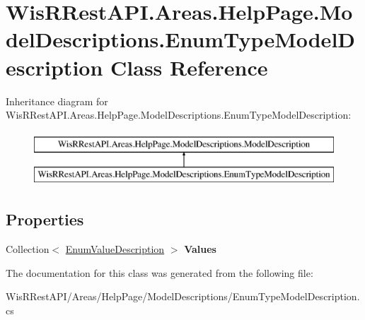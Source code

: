 \hypertarget{class_wis_r_rest_a_p_i_1_1_areas_1_1_help_page_1_1_model_descriptions_1_1_enum_type_model_description}{}\section{Wis\+R\+Rest\+A\+P\+I.\+Areas.\+Help\+Page.\+Model\+Descriptions.\+Enum\+Type\+Model\+Description Class Reference}
\label{class_wis_r_rest_a_p_i_1_1_areas_1_1_help_page_1_1_model_descriptions_1_1_enum_type_model_description}
Inheritance diagram for Wis\+R\+Rest\+A\+P\+I.\+Areas.\+Help\+Page.\+Model\+Descriptions.\+Enum\+Type\+Model\+Description\+:\begin{figure}[H]
\begin{center}
\leavevmode
\includegraphics[height=2.000000cm]{class_wis_r_rest_a_p_i_1_1_areas_1_1_help_page_1_1_model_descriptions_1_1_enum_type_model_description}
\end{center}
\end{figure}
\subsection*{Properties}
\begin{DoxyCompactItemize}
\item 
\hypertarget{class_wis_r_rest_a_p_i_1_1_areas_1_1_help_page_1_1_model_descriptions_1_1_enum_type_model_description_aac44521684d769b6ebd937a9b0ead60c}{}Collection$<$ \hyperlink{class_wis_r_rest_a_p_i_1_1_areas_1_1_help_page_1_1_model_descriptions_1_1_enum_value_description}{Enum\+Value\+Description} $>$ {\bfseries Values}\label{class_wis_r_rest_a_p_i_1_1_areas_1_1_help_page_1_1_model_descriptions_1_1_enum_type_model_description_aac44521684d769b6ebd937a9b0ead60c}

\end{DoxyCompactItemize}


The documentation for this class was generated from the following file\+:\begin{DoxyCompactItemize}
\item 
Wis\+R\+Rest\+A\+P\+I/\+Areas/\+Help\+Page/\+Model\+Descriptions/Enum\+Type\+Model\+Description.\+cs\end{DoxyCompactItemize}
